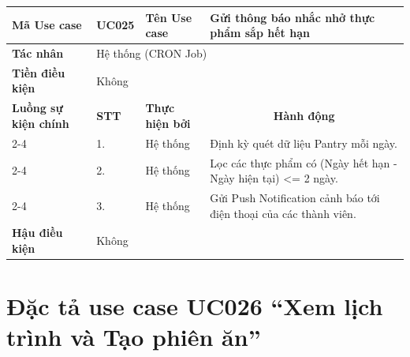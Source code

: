 \begin{longtable}{|p{2.7cm}|p{0.8cm}|p{2.6cm}|p{7.3cm}|}
\hline
\cellcolor[HTML]{D5F5E3}\textbf{Mã Use case} & \multicolumn{1}{l|}{UC025} & \cellcolor[HTML]{D5F5E3}\textbf{Tên Use case} & Gửi thông báo nhắc nhở thực phẩm sắp hết hạn \\ \hline
\cellcolor[HTML]{D5F5E3}\textbf{Tác nhân} & \multicolumn{3}{p{10.7cm}|}{Hệ thống (CRON Job)} \\ \hline
\cellcolor[HTML]{D5F5E3}\textbf{Tiền điều kiện} & \multicolumn{3}{p{10.7cm}|}{Không} \\ \hline

\cellcolor[HTML]{D5F5E3}\textbf{Luồng sự kiện chính} & \cellcolor[HTML]{FDEBD0}\textbf{STT} & \cellcolor[HTML]{FDEBD0}\textbf{Thực hiện bởi} & \multicolumn{1}{c|}{\cellcolor[HTML]{FDEBD0}\textbf{Hành động}} \\ \cline{2-4} 
\cellcolor[HTML]{D5F5E3} & 1. & Hệ thống & Định kỳ quét dữ liệu Pantry mỗi ngày. \\ \cline{2-4} 
\cellcolor[HTML]{D5F5E3} & 2. & Hệ thống & Lọc các thực phẩm có (Ngày hết hạn - Ngày hiện tại) <= 2 ngày. \\ \cline{2-4} 
\cellcolor[HTML]{D5F5E3} & 3. & Hệ thống & Gửi Push Notification cảnh báo tới điện thoại của các thành viên. \\ \hline

\cellcolor[HTML]{D5F5E3}\textbf{Hậu điều kiện} & \multicolumn{3}{p{10.7cm}|}{Không} \\ \hline
\end{longtable}
\endgroup

\section{Đặc tả use case UC026 ``Xem lịch trình và Tạo phiên ăn''}
\vspace{0.5cm}

\begingroup
\renewcommand{\arraystretch}{1.5}

